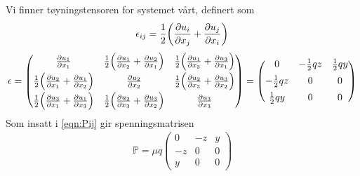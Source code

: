\documentclass[12p,a4paper]{article}
\newcommand{\m}{\mathbb}
\newcommand{\half}{\frac{1}{2}}
\begin{document}
Vi finner tøyningstensoren for systemet vårt, definert som
\begin{align*}
    \epsilon_{ij} = \half\qty(\frac{\partial u_i}{\partial x_j} + \frac{\partial u_j}{\partial x_i})
\end{align*}
\begin{align*}
    \m \epsilon =
    \begin{pmatrix}
        \frac{\partial u_1}{\partial x_1} & \half\qty(\frac{\partial u_1}{\partial x_2} + \frac{\partial u_2}{\partial x_1}) & \half\qty(\frac{\partial u_1}{\partial x_3} + \frac{\partial u_3}{\partial x_1}) \\[0.5em]
        \half\qty(\frac{\partial u_2}{\partial x_1} + \frac{\partial u_1}{\partial x_2}) & \frac{\partial u_2}{\partial x_2} & \half\qty(\frac{\partial u_2}{\partial x_3} + \frac{\partial u_3}{\partial x_2}) \\[0.5em]
        \half\qty(\frac{\partial u_3}{\partial x_1} + \frac{\partial u_1}{\partial x_3}) & \half\qty(\frac{\partial u_2}{\partial x_3} + \frac{\partial u_3}{\partial x_2}) & \frac{\partial u_3}{\partial x_3} \\
    \end{pmatrix}
    =
    \begin{pmatrix}
        0  &  -\half qz  &  \half qy \\[0.5em]
        -\half qz  &  0  &  0 \\[0.5em]
        \half qy  &  0  &  0
    \end{pmatrix}
\end{align*}
Som insatt i \ref{eqn:Pij} gir spenningsmatrisen
\begin{align*}
    \m P = \mu q
    \begin{pmatrix}
        0  &  -z  &  y \\
        -z  &  0  &  0 \\
        y  &  0  &  0
    \end{pmatrix}
\end{align*}
\end{document}
